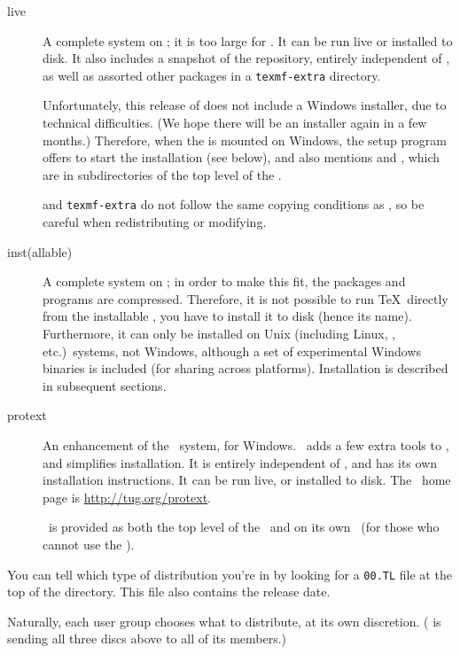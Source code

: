 \documentclass{article}
\begin{document}
\begin{description}

\item [live] A complete system on ; it is too large
for .  It can be run live or installed to disk.  It also
includes a snapshot of the \CTAN{} repository, entirely independent of
\TL{}, as well as assorted other packages in a 
\texttt{texmf-extra} directory.

Unfortunately, this release of \TL{} does not include a Windows
installer, due to technical difficulties.  (We hope there will be an
installer again in a few months.)  Therefore, when the \DVD{} is mounted
on Windows, the setup program offers to start the 
installation (see below), and also mentions \CTAN{} and \TL{}, which are
in subdirectories of the top level of the \DVD{}.

\CTAN{} and \texttt{texmf-extra} do not follow the same copying
conditions as \TL{}, so be careful when redistributing or
modifying.

\item [inst(allable)] A complete system on \CD; in order to make this fit,
the packages and programs are compressed.  Therefore, it is not possible
to run \TeX\ directly from the installable \CD, you have to install it
to disk (hence its name).  Furthermore, it can only be installed on Unix
(including Linux, \MacOSX, etc.)\ systems, not Windows, although a set
of experimental Windows binaries is included (for sharing across
platforms).  Installation is described in subsequent sections.
   
\item [protext] An enhancement of the \MIKTEX\ system, for Windows.
\ProTeXt\ adds a few extra tools to \MIKTEX, and simplifies
installation.  It is entirely independent of \TL{}, and has its own
installation instructions.  It can be run live, or installed to disk.
The \ProTeXt\ home page is \url{http://tug.org/protext}.

\ProTeXt\ is provided as both the top level of the  \DVD\
and on its own \CD\ (for those who cannot use the \DVD).

\end{description}

\noindent You can tell which type of distribution you're in by looking
for a \texttt{00\var{type}.TL} file at the top of the \TL{} directory.
This file also contains the \TL{} release date.

Naturally, each user group chooses what to distribute, at its own
discretion.  (\acro{TUG} is sending all three discs above to all of its
members.)
\end{document}
